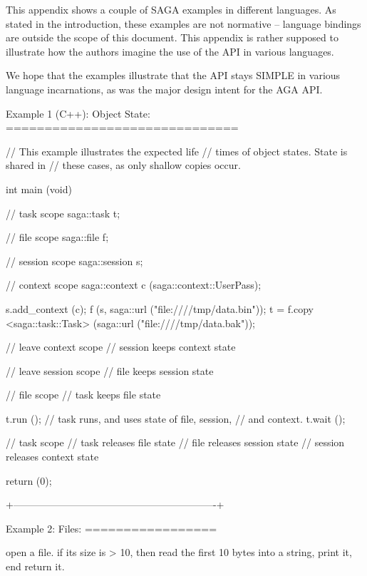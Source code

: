  
  This appendix shows a couple of SAGA examples in different
  languages.  As stated in the introduction, these examples are not
  normative -- language bindings are outside the scope of this
  document.  This appendix is rather supposed to illustrate how the
  authors imagine the use of the API in various languages.
  
  We hope that the examples illustrate that the API stays SIMPLE in
  various language incarnations, as was the major design intent for
  the AGA API.
 
 \begin{mycode}
 
  Example 1 (C++): Object State:
  ==============================
  
    // This example illustrates the expected life 
    // times of object states.  State is shared in 
    // these cases, as only shallow copies occur.
 
    int main (void)
    {
      { // task scope
        saga::task t;
  
        { // file scope
          saga::file f;
  
          { // session scope
            saga::session s;
  
            { // context scope
              saga::context c (saga::context::UserPass);
  
              s.add_context (c);
              f (s, saga::url ("file:////tmp/data.bin"));
              t = f.copy <saga::task::Task> 
                    (saga::url ("file:////tmp/data.bak"));
  
            } // leave context scope
              // session keeps context state
  
          } // leave session scope
            // file keeps session state
  
        } // file scope
          // task keeps file state
  
        t.run ();
        // task runs, and uses state of file, session, 
        // and context.
        t.wait ();
  
      } // task scope
        // task    releases file state
        // file    releases session state
        // session releases context state
  
      return (0);
    }
  
  
  +-------------------------------------------------------------+
  
  Example 2: Files:
  =================
  
    open a file. if its size is > 10, then read the first 10
    bytes into a string, print it, end return it.
  

\end{mycode}
